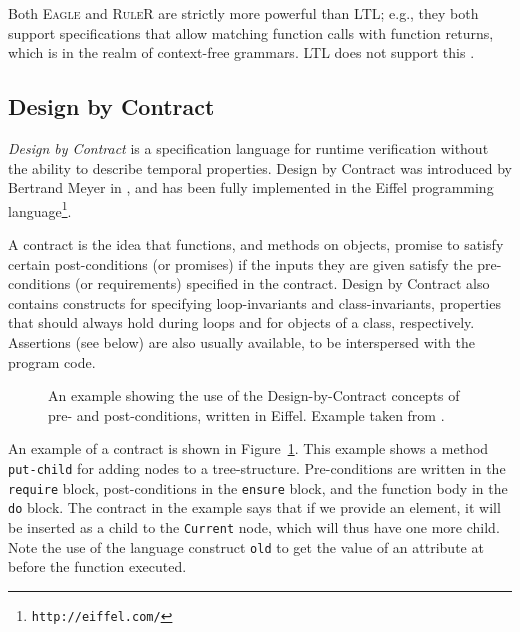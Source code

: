 Both \textsc{Eagle} and \textsc{RuleR} are strictly more powerful than LTL;
e.g., they both support specifications that allow matching function calls with
function returns, which is in the realm of context-free grammars. LTL does not
support this \cite{barringer03eagle,barringer07ruler}.


\subsection{Design by Contract}

\textit{Design by Contract} is a specification language for runtime
verification without the ability to describe temporal properties. Design by
Contract was introduced by Bertrand Meyer in \cite{meyer92applyingdbc}, and has
been fully implemented in the Eiffel programming
language\footnote{\texttt{http://eiffel.com/}}.

A contract is the idea that functions, and methods on objects, promise to
satisfy certain post-conditions (or promises) if the inputs they are given
satisfy the pre-conditions (or requirements) specified in the contract. Design
by Contract also contains constructs for specifying loop-invariants and
class-invariants, properties that should always hold during loops and for
objects of a class, respectively. Assertions (see below) are also usually
available, to be interspersed with the program code.

\begin{figure}[h!]
	\begin{center}
	\begin{minipage}{0.7\textwidth}
    \lstset{language=Eiffel}
		
	\end{minipage}
	\end{center}
  \caption{An example showing the use of the Design-by-Contract concepts of
    pre- and post-conditions, written in Eiffel. Example taken from
    \cite{meyer92applyingdbc}.}
	\label{figure-dbc-example}
\end{figure}

An example of a contract is shown in Figure~\ref{figure-dbc-example}. This
example shows a method \texttt{put-child} for adding nodes to a tree-structure.
Pre-conditions are written in the \texttt{require} block, post-conditions in
the \texttt{ensure} block, and the function body in the \texttt{do} block. The
contract in the example says that if we provide an element, it will be inserted
as a child to the \texttt{Current} node, which will thus have one more child.
Note the use of the language construct \texttt{old} to get the value of an
attribute at before the function executed.

